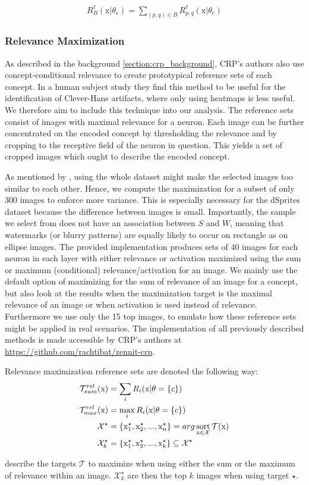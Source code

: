 \begin{align}\label{eq:local_importance}
    R_{B}^{\ell}(\mathrm{x} | \theta_c) = \sum_{(p,q) \in B} R_{p,q}^{\ell}(\mathrm{x} | \theta_c)
\end{align}

\subsubsection{Relevance Maximization}
As described in the background \cref{section:crp_background}, CRP's authors also use concept-conditional relevance to create prototypical reference sets of each concept. In a human subject study \citep{Achtibat2023} they find this method to be useful for the identification of Clever-Hans artifacts, where only using heatmaps is less useful. We therefore aim to include this technique into our analysis. The reference sets consist of images with maximal relevance for a neuron. Each image can be further concentrated on the encoded concept by thresholding the relevance and by cropping to the receptive field of the neuron in question. This yields a set of cropped images which ought to describe the encoded concept. 

As mentioned by \citet{Achtibat2022}, using the whole dataset might make the selected images too similar to each other. Hence, we compute the maximization for a subset of only 300 images to enforce more variance. This is especially necessary for the dSprites dataset because the difference between images is small. Importantly, the sample we select from does not have an association between $S$ and $W$, meaning that watermarks (or blurry patterns) are equally likely to occur on rectangle as on ellipse images. 
The provided implementation produces sets of 40 images for each neuron in each layer with either relevance or activation maximized using the sum or maximum (conditional) relevance/activation for an image. We mainly use the default option of maximizing for the sum of relevance of an image for a concept, but also look at the results when the maximization target is the maximal relevance of an image or when activation is used instead of relevance. Furthermore we use only the 15 top images, to emulate how these reference sets might be applied in real scenarios. 
The implementation of all previously described methods is made accessible by CRP's authors at
\url{https://github.com/rachtibat/zennit-crp}. 

Relevance maximization reference sets are denoted the following way:
 \begin{align}
\mathcal{T}_{sum}^{rel} (\mathrm{x}) & = \sum_{i} R_i(\mathrm{x}|\theta=\{c\}) \label{eq:rel_sum}\\
\mathcal{T}_{max}^{rel} (\mathrm{x}) & = \max_{i} R_i(\mathrm{x}|\theta=\{c\}) \label{eq:rel_max}\\
\mathcal{X}^{\star} & = \{ \mathrm{x}_{1}^{\star},\mathrm{x}_{2}^{\star},..., \mathrm{x}_{n}^{\star} \} = arg \operatorname*{sort}_{\mathrm{x} \in \mathcal{X}} \mathcal{T}(\mathrm{x}) \\
\mathcal{X}_{k}^{\star} & = \{ \mathrm{x}_{1}^{\star},\mathrm{x}_{2}^{\star},..., \mathrm{x}_{k}^{\star} \} \subseteq \mathcal{X}^{\star}
 \end{align}

  describe the targets $\mathcal{T}$ to maximize when using either the sum or the maximum of relevance within an image. $\mathcal{X}_k^\star$ are then the top $k$ images when using target $\star$.